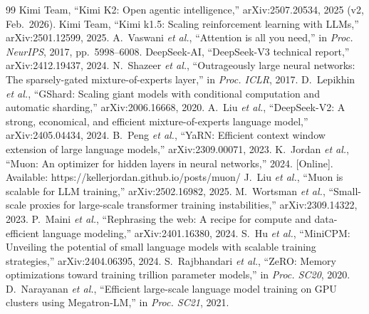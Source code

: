 \documentclass[10pt,twocolumn,letterpaper]{article}
\begin{document}
\balance
\begingroup
\footnotesize
\begin{thebibliography}{99}\setlength{\itemsep}{0pt}\setlength{\parsep}{0pt}
 Kimi Team, ``Kimi K2: Open agentic intelligence,'' arXiv:2507.20534, 2025 (v2, Feb.\ 2026).
 Kimi Team, ``Kimi k1.5: Scaling reinforcement learning with LLMs,'' arXiv:2501.12599, 2025.
 A.~Vaswani \emph{et al.}, ``Attention is all you need,'' in \emph{Proc. NeurIPS}, 2017, pp.\ 5998--6008.
 DeepSeek-AI, ``DeepSeek-V3 technical report,'' arXiv:2412.19437, 2024.
 N.~Shazeer \emph{et al.}, ``Outrageously large neural networks: The sparsely-gated mixture-of-experts layer,'' in \emph{Proc. ICLR}, 2017.
 D.~Lepikhin \emph{et al.}, ``GShard: Scaling giant models with conditional computation and automatic sharding,'' arXiv:2006.16668, 2020.
 A.~Liu \emph{et al.}, ``DeepSeek-V2: A strong, economical, and efficient mixture-of-experts language model,'' arXiv:2405.04434, 2024.
 B.~Peng \emph{et al.}, ``YaRN: Efficient context window extension of large language models,'' arXiv:2309.00071, 2023.
 K.~Jordan \emph{et al.}, ``Muon: An optimizer for hidden layers in neural networks,'' 2024. [Online]. Available: https://kellerjordan.github.io/posts/muon/
 J.~Liu \emph{et al.}, ``Muon is scalable for LLM training,'' arXiv:2502.16982, 2025.
 M.~Wortsman \emph{et al.}, ``Small-scale proxies for large-scale transformer training instabilities,'' arXiv:2309.14322, 2023.
 P.~Maini \emph{et al.}, ``Rephrasing the web: A recipe for compute and data-efficient language modeling,'' arXiv:2401.16380, 2024.
 S.~Hu \emph{et al.}, ``MiniCPM: Unveiling the potential of small language models with scalable training strategies,'' arXiv:2404.06395, 2024.
 S.~Rajbhandari \emph{et al.}, ``ZeRO: Memory optimizations toward training trillion parameter models,'' in \emph{Proc. SC20}, 2020.
 D.~Narayanan \emph{et al.}, ``Efficient large-scale language model training on GPU clusters using Megatron-LM,'' in \emph{Proc. SC21}, 2021.
\end{thebibliography}
\endgroup
\end{document}

